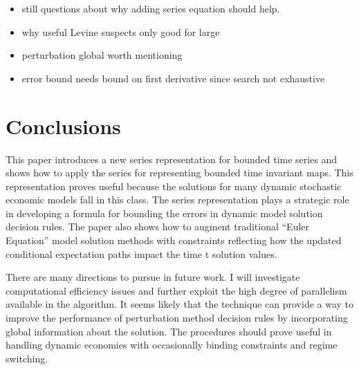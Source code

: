 \documentclass[12pt]{article}
\begin{document}
\begin{itemize}
\item still questions about why adding series equation should help.
\item why useful Levine suspects only good for large 
\item perturbation global worth mentioning
\item error bound needs bound on first derivative since search not exhaustive
\end{itemize}

\section{Conclusions}
This paper introduces a new series representation for bounded time series and
shows how to apply the series for representing bounded time invariant maps.
This representation proves useful because the solutions for many
dynamic stochastic economic models fall in this class.
The series representation plays a strategic role in developing a formula for bounding the errors in dynamic model solution decision rules.  The paper
also shows how to  augment traditional ``Euler Equation'' model solution
methods with constraints reflecting how the updated
conditional expectation paths impact the time t solution values.


There are many directions to pursue in future work.
I will investigate computational efficiency issues and further
exploit the high degree of parallelism available in the algorithm.
It seems likely that the technique can provide a way to improve 
the performance of  perturbation method
decision rules by incorporating global information about the solution.
The procedures should prove useful
in handling dynamic economies with occasionally binding constraints\citep{holden15:_exist_dsge,guerrieri15:_occbin} and regime switching.

\label{sec:conc}
\end{document}
